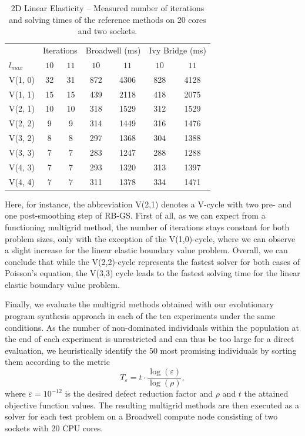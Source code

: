 \begin{table}
	\caption[2D Linear Elasticity -- Number of iterations and solving times of the reference methods]{2D Linear Elasticity -- Measured number of iterations and solving times of the reference methods on 20 cores and two sockets.}
	\label{table:linear-elasticity-2D-reference-methods}
	\centering
	\begin{tabular}{l c c c c c c}
		\toprule
		& \multicolumn{2}{c}{Iterations} & \multicolumn{2}{c}{Broadwell (ms)} & \multicolumn{2}{c}{Ivy Bridge (ms)} \\
		\cmidrule(r){2-3} \cmidrule(r){4-5} \cmidrule(r){6-7}
		$l_{max}$ & $10$& $11$ & $10$ & $11$ & $10$ & $11$\\
		\midrule
		V(1, 0) & 32 & 31 & 872 & 4306 & 828 & 4128 \\
		\midrule
		V(1, 1) & 15 & 15 & 439 & 2118 & 418 & 2075\\
		\midrule
		V(2, 1) & 10 & 10 & 318 & 1529 & 312 & 1529 \\
		\midrule
		V(2, 2) & 9 & 9 & 314 & 1449 & 316 & 1476 \\
		\midrule
		V(3, 2) & 8 & 8 & 297 & 1368 & 304 & 1388 \\
		\midrule
		V(3, 3) & 7 & 7 & 283 & 1247 & 288 & 1288 \\
		\midrule
		V(4, 3) & 7 & 7 & 293 & 1320 & 313 & 1397 \\
		\midrule
		V(4, 4) & 7 & 7 & 311 & 1378 & 334 & 1471 \\
		\bottomrule
	\end{tabular}
\end{table}
Here, for instance, the abbreviation V(2,1) denotes a V-cycle with two pre- and one post-smoothing step of RB-GS.
First of all, as we can expect from a functioning multigrid method, the number of iterations stays constant for both problem sizes, only with the exception of the V(1,0)-cycle, where we can observe a slight increase for the linear elastic boundary value problem.
Overall, we can conclude that while the V(2,2)-cycle represents the fastest solver for both cases of Poisson's equation, the V(3,3) cycle leads to the fastest solving time for the linear elastic boundary value problem.

Finally, we evaluate the multigrid methods obtained with our evolutionary program synthesis approach in each of the ten experiments under the same conditions.
As the number of non-dominated individuals within the population at the end of each experiment is unrestricted and can thus be too large for a direct evaluation, we heuristically identify the 50 most promising individuals by sorting them according to the metric
\begin{equation*}
	T_{\varepsilon} = t \cdot \frac{\log(\varepsilon)}{\log(\rho)},
\end{equation*}
where $\varepsilon = 10^{-12}$ is the desired defect reduction factor and $\rho$ and $t$ the attained objective function values.
The resulting multigrid methods are then executed as a solver for each test problem on a Broadwell compute node consisting of two sockets with 20 CPU cores.

